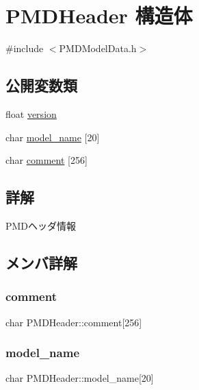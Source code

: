 \hypertarget{struct_p_m_d_header}{}\section{P\+M\+D\+Header 構造体}
\label{struct_p_m_d_header}


{\ttfamily \#include $<$P\+M\+D\+Model\+Data.\+h$>$}

\subsection*{公開変数類}
\begin{DoxyCompactItemize}
\item 
float \mbox{\hyperlink{struct_p_m_d_header_a790354fcbe90f7c1387e5117e0a25067}{version}}
\item 
char \mbox{\hyperlink{struct_p_m_d_header_aadc1fce233f6ee45b4a6e344b042ce6f}{model\+\_\+name}} \mbox{[}20\mbox{]}
\item 
char \mbox{\hyperlink{struct_p_m_d_header_accac03d78cccd3f8f061b8e807ef5936}{comment}} \mbox{[}256\mbox{]}
\end{DoxyCompactItemize}


\subsection{詳解}
P\+M\+Dヘッダ情報 

\subsection{メンバ詳解}
\mbox{\label{struct_p_m_d_header_accac03d78cccd3f8f061b8e807ef5936}} 
\subsubsection{\texorpdfstring{comment}{comment}}
{\footnotesize\ttfamily char P\+M\+D\+Header\+::comment\mbox{[}256\mbox{]}}

\mbox{\label{struct_p_m_d_header_aadc1fce233f6ee45b4a6e344b042ce6f}} 
\subsubsection{\texorpdfstring{model\+\_\+name}{model\_name}}
{\footnotesize\ttfamily char P\+M\+D\+Header\+::model\+\_\+name\mbox{[}20\mbox{]}}

